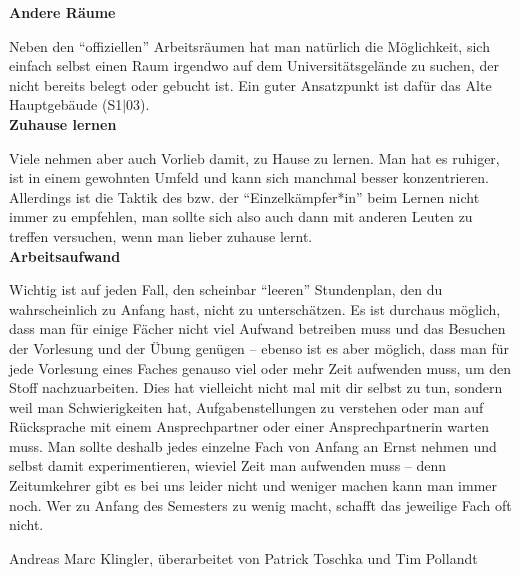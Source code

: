 {\noindent\textbf{Andere Räume}

Neben den "`offiziellen"' Arbeitsräumen hat man natürlich die Möglichkeit, sich einfach selbst einen Raum irgendwo auf dem Universitätsgelände zu suchen, der nicht bereits belegt oder gebucht ist. Ein guter Ansatzpunkt ist dafür das Alte Hauptgebäude (S1$|$03).\\

\noindent\textbf{Zuhause lernen}

Viele nehmen aber auch Vorlieb damit, zu Hause zu lernen. Man hat es ruhiger, ist in einem gewohnten Umfeld und kann sich manchmal besser konzentrieren. Allerdings ist die Taktik des bzw. der "`Einzelkämpfer*in"' beim Lernen nicht immer zu empfehlen, man sollte sich also auch dann mit anderen Leuten zu treffen versuchen, wenn man lieber zuhause lernt.\\

\noindent\textbf{Arbeitsaufwand}

Wichtig ist auf jeden Fall, den scheinbar "`leeren"' Stundenplan, den du wahrscheinlich zu Anfang hast, nicht zu unterschätzen. Es ist durchaus möglich, dass man für einige Fächer nicht viel Aufwand betreiben muss und das Besuchen der Vorlesung und der Übung genügen – ebenso ist es aber möglich, dass man für jede Vorlesung eines Faches genauso viel oder mehr Zeit aufwenden muss, um den Stoff nachzuarbeiten. Dies hat vielleicht nicht mal mit dir selbst zu tun, sondern weil man Schwierigkeiten hat, Aufgabenstellungen zu verstehen oder man auf Rücksprache mit einem Ansprechpartner oder einer Ansprechpartnerin warten muss. Man sollte deshalb jedes einzelne Fach von Anfang an Ernst nehmen und selbst damit experimentieren, wieviel Zeit man aufwenden muss – denn Zeitumkehrer gibt es bei uns leider nicht und weniger machen kann man immer noch. Wer zu Anfang des Semesters zu wenig macht, schafft das jeweilige Fach oft nicht.
}
{Andreas Marc Klingler, überarbeitet von Patrick Toschka und Tim Pollandt}
